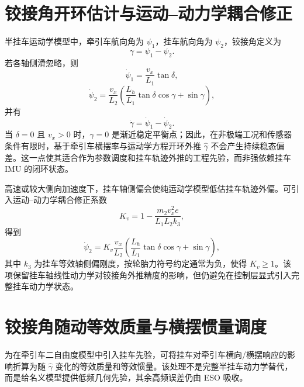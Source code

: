\documentclass[UTF8,zihao=-4]{ctexrep}
\begin{document}
\section{铰接角开环估计与运动--动力学耦合修正}
半挂车运动学模型中，牵引车航向角为 $\psi_1$，挂车航向角为 $\psi_2$，铰接角定义为
\begin{equation}
    \gamma=\psi_1-\psi_2.
\end{equation}
若各轴侧滑忽略，则
\begin{equation}
    \dot\psi_1=\frac{v_x}{L_1}\tan\delta,
\end{equation}
\begin{equation}
    \dot\psi_2=\frac{v_x}{L_2}\left(\frac{L_h}{L_1}\tan\delta\cos\gamma+\sin\gamma\right),
    \label{eq:trailer_kin}
\end{equation}
并有
\begin{equation}
    \dot\gamma=\dot\psi_1-\dot\psi_2.
\end{equation}
当 $\delta=0$ 且 $v_x>0$ 时，$\gamma=0$ 是渐近稳定平衡点；因此，在非极端工况和传感器条件有限时，基于牵引车横摆率与运动学方程开环外推 $\hat\gamma$ 不会产生持续稳态偏差。这一点使其适合作为参数调度和挂车轨迹外推的工程先验，而非强依赖挂车 IMU 的闭环状态。

高速或较大侧向加速度下，挂车轴侧偏会使纯运动学模型低估挂车轨迹外偏。可引入运动--动力学耦合修正系数
\begin{equation}
    K_v=1-\frac{m_2v_x^2e}{L_1L_2k_3},
\end{equation}
得到
\begin{equation}
    \dot\psi_2=K_v\frac{v_x}{L_2}\left(\frac{L_h}{L_1}\tan\delta\cos\gamma+\sin\gamma\right),
    \label{eq:trailer_ckds}
\end{equation}
其中 $k_3$ 为挂车等效轴侧偏刚度，按轮胎力符号约定通常为负，使得 $K_v\geq 1$。该项保留挂车轴线性动力学对铰接角外推精度的影响，但仍避免在控制层显式引入完整挂车动力学状态。

\section{铰接角随动等效质量与横摆惯量调度}
为在牵引车二自由度模型中引入挂车先验，可将挂车对牵引车横向/横摆响应的影响折算为随 $\hat\gamma$ 变化的等效质量和等效惯量。该处理不是完整半挂车动力学替代，而是给名义模型提供低频几何先验，其余高频误差仍由 ESO 吸收。
\end{document}

